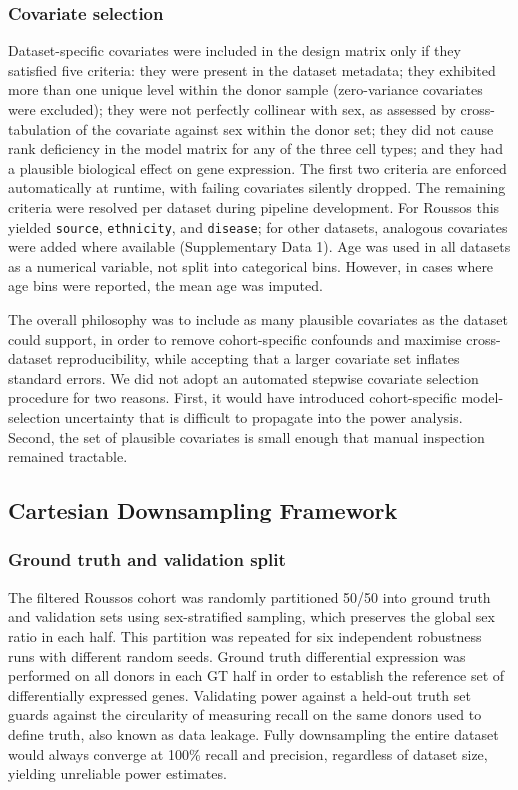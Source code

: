 \documentclass[
]{article}
\begin{document}
\subsubsection{Covariate selection}\label{covariate-selection}

Dataset-specific covariates were included in the design matrix only if
they satisfied five criteria: they were present in the dataset metadata;
they exhibited more than one unique level within the donor sample
(zero-variance covariates were excluded); they were not perfectly
collinear with sex, as assessed by cross-tabulation of the covariate
against sex within the donor set; they did not cause rank deficiency in
the model matrix for any of the three cell types; and they had a
plausible biological effect on gene expression. The first two criteria
are enforced automatically at runtime, with failing covariates silently
dropped. The remaining criteria were resolved per dataset during
pipeline development. For Roussos this yielded \texttt{source},
\texttt{ethnicity}, and \texttt{disease}; for other datasets, analogous
covariates were added where available (Supplementary Data 1). Age was
used in all datasets as a numerical variable, not split into categorical
bins. However, in cases where age bins were reported, the mean age was
imputed.

The overall philosophy was to include as many plausible covariates as
the dataset could support, in order to remove cohort-specific confounds
and maximise cross-dataset reproducibility, while accepting that a
larger covariate set inflates standard errors. We did not adopt an
automated stepwise covariate selection procedure for two reasons. First,
it would have introduced cohort-specific model-selection uncertainty
that is difficult to propagate into the power analysis. Second, the set
of plausible covariates is small enough that manual inspection remained
tractable.

\subsection{Cartesian Downsampling
Framework}\label{cartesian-downsampling-framework}

\subsubsection{Ground truth and validation
split}\label{ground-truth-and-validation-split}

The filtered Roussos cohort was randomly partitioned 50/50 into ground
truth and validation sets using sex-stratified sampling, which preserves
the global sex ratio in each half. This partition was repeated for six
independent robustness runs with different random seeds. Ground truth
differential expression was performed on all donors in each GT half in
order to establish the reference set of differentially expressed genes.
Validating power against a held-out truth set guards against the
circularity of measuring recall on the same donors used to define truth,
also known as data leakage. Fully downsampling the entire dataset would
always converge at 100\% recall and precision, regardless of dataset
size, yielding unreliable power estimates.
\end{document}
